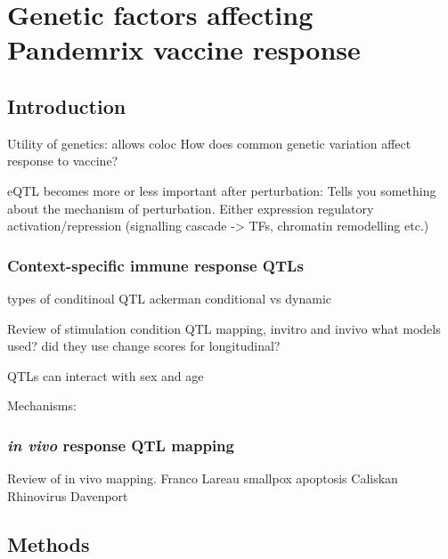 %
%

\chapter{Genetic factors affecting Pandemrix vaccine response}

\section{Introduction}

Utility of genetics:
allows coloc
How does common genetic variation affect response to vaccine?

eQTL becomes more or less important after perturbation: Tells you something about the mechanism of perturbation.
Either expression regulatory activation/repression (signalling cascade -> TFs, chromatin remodelling etc.)

\subsection{Context-specific immune response QTLs}

types of conditinoal QTL
    ackerman conditional vs dynamic

Review of stimulation condition QTL mapping, invitro and invivo
what models used? did they use change scores for longitudinal?

QTLs can interact with sex and age

Mechanisms: 

\subsection{\textit{in vivo} response QTL mapping}

Review of in vivo mapping.
Franco
Lareau smallpox apoptosis
Caliskan Rhinovirus
Davenport

\section{Methods}

